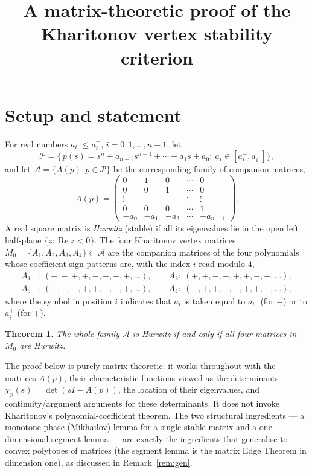 \documentclass[12pt]{article}
\newtheorem{theorem}{Theorem}
\theoremstyle{definition}
\DeclareMathOperator{\Real}{Re}
\begin{document}
\title{A matrix-theoretic proof of the Kharitonov vertex stability criterion}
\author{}
\date{}
\maketitle

\section{Setup and statement}

For real numbers $a_i^-\le a_i^+$, $i=0,1,\dots,n-1$, let
\[
\mathcal P=\Big\{\,p(s)=s^n+a_{n-1}s^{n-1}+\cdots+a_1s+a_0:\ a_i\in[a_i^-,a_i^+]\Big\},
\]
and let $\mathcal A=\{A(p):p\in\mathcal P\}$ be the corresponding family of companion
matrices,
\[
A(p)=\begin{pmatrix}
0&1&0&\cdots&0\\
0&0&1&\cdots&0\\
\vdots&&&\ddots&\vdots\\
0&0&0&\cdots&1\\
-a_0&-a_1&-a_2&\cdots&-a_{n-1}
\end{pmatrix}.
\]
A real square matrix is \emph{Hurwitz} (stable) if all its eigenvalues lie in the open
left half-plane $\{z:\Real z<0\}$. The four Kharitonov vertex matrices
$M_0=\{A_1,A_2,A_3,A_4\}\subset\mathcal A$ are the companion matrices of the four
polynomials whose coefficient sign patterns are, with the index $i$ read modulo $4$,
\begin{equation}\label{eq:patterns}
\begin{aligned}
A_1&:\ (-,-,+,+,-,-,+,+,\dots),\qquad
A_2:\ (+,+,-,-,+,+,-,-,\dots),\\
A_3&:\ (+,-,-,+,+,-,-,+,\dots),\qquad
A_4:\ (-,+,+,-,-,+,+,-,\dots),
\end{aligned}
\end{equation}
where the symbol in position $i$ indicates that $a_i$ is taken equal to $a_i^-$ (for $-$)
or to $a_i^+$ (for $+$).

\begin{theorem}\label{thm:main}
The whole family $\mathcal A$ is Hurwitz if and only if all four matrices in $M_0$ are
Hurwitz.
\end{theorem}

The proof below is purely matrix-theoretic: it works throughout with the matrices
$A(p)$, their characteristic functions viewed as the determinants
$\chi_p(s)=\det(sI-A(p))$, the location of their eigenvalues, and continuity/argument
arguments for these determinants. It does not invoke Kharitonov's polynomial-coefficient
theorem. The two structural ingredients --- a monotone-phase (Mikhailov) lemma for a
single stable matrix and a one-dimensional segment lemma --- are exactly the ingredients
that generalise to convex polytopes of matrices (the segment lemma is the matrix Edge
Theorem in dimension one), as discussed in Remark~\ref{rem:gen}.
\end{document}

